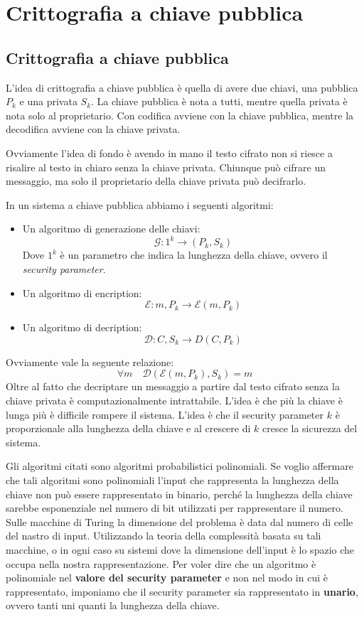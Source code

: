 \chapter{Crittografia a chiave pubblica}
\section{Crittografia a chiave pubblica}
L'idea di crittografia a chiave pubblica è quella di avere due chiavi, una
pubblica $P_k$ e una privata $S_k$. La chiave pubblica è nota a tutti, mentre
quella privata è nota solo al proprietario. 
Con codifica avviene con la chiave pubblica, mentre la decodifica avviene con la
chiave privata.

Ovviamente l'idea di fondo è avendo in mano il testo cifrato non si riesce a
risalire al testo in chiaro senza la chiave privata. Chiunque può cifrare un
messaggio, ma solo il proprietario della chiave privata può decifrarlo.

In un sistema a chiave pubblica abbiamo i seguenti algoritmi:
\begin{itemize}
    \item Un algoritmo di generazione delle chiavi:
    \[
        \mathcal{G}: 1^k \to (P_k, S_k) 
    \]
    Dove $1^k$ è un parametro che indica la lunghezza della chiave, ovvero il \textit{security parameter}.
    \item Un algoritmo di encription:
      \[
        \mathcal{E}: m, P_k \to \mathcal{E}(m, P_k)
    \]
    \item Un algoritmo di decription:
    \[
          \mathcal{D}: C, S_k \to D(C, P_k)
    \]
\end{itemize}
Ovviamente vale la seguente relazione:
\begin{equation}
    \forall m \quad \mathcal{D}(\mathcal{E}(m, P_k), S_k) = m
\end{equation}
Oltre al fatto che decriptare un messaggio a partire dal testo cifrato senza 
la chiave privata è computazionalmente intrattabile. L'idea è che più la chiave
è lunga più è difficile rompere il sistema. L'idea è che il security parameter
$k$ è proporzionale alla lunghezza della chiave e al crescere di $k$ cresce
la sicurezza del sistema.

Gli algoritmi citati sono algoritmi probabilistici polinomiali. Se voglio 
affermare che tali algoritmi sono polinomiali l'input che rappresenta la 
lunghezza della chiave non può essere 
rappresentato in binario, perché la lunghezza della chiave sarebbe
esponenziale nel numero di bit utilizzati per rappresentare il numero. 
Sulle macchine di Turing la dimensione del problema è data dal numero di 
celle del nastro di input. Utilizzando la teoria della complessità 
basata su tali macchine, o in ogni caso su sistemi dove la dimensione 
dell'input è lo spazio che occupa nella nostra rappresentazione. Per 
voler dire che un algoritmo è polinomiale nel \textbf{valore del 
security parameter} e non nel modo in cui è rappresentato, imponiamo 
che il security parameter sia rappresentato in \textbf{unario}, ovvero 
tanti uni quanti la lunghezza della chiave.


